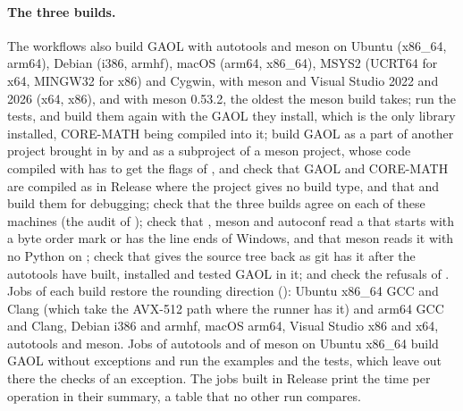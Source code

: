 \documentclass[12pt,a4paper,twoside,openright]{book}
\begin{document}
\paragraph{The three builds.} The workflows also build GAOL with autotools
and meson on Ubuntu (x86\_64, arm64), Debian (i386, armhf), macOS (arm64,
x86\_64), MSYS2 (UCRT64 for x64, MINGW32 for x86) and Cygwin, with meson and
Visual Studio 2022 and 2026 (x64, x86), and with meson 0.53.2, the oldest
the meson build takes; run the tests, and build them again with the GAOL
they install, which is the only library installed, CORE-MATH being compiled
into it; build GAOL as a part of another project brought in by
 and as a subproject of a meson project, whose code
compiled with  has to get the flags of , and
check that GAOL and CORE-MATH are compiled as in Release where the project
gives no build type, and that  and 
build them for debugging;\newinvfive{} check that the three builds agree on
each of these machines (the audit of ); check that
, meson and autoconf read a  that starts
with a byte order mark or has the line ends of Windows, and that meson reads
it with no Python on ; check that  gives the
source tree back as git has it after the autotools have built, installed
and tested GAOL in it; and check the refusals of .
Jobs of each build restore the rounding direction
(): Ubuntu x86\_64 GCC and Clang (which
take the AVX-512 path where the runner has it) and arm64 GCC and Clang,
Debian i386 and armhf, macOS arm64, Visual Studio x86 and x64, autotools and
meson. Jobs of autotools and of meson on Ubuntu x86\_64 build GAOL without
exceptions and run the examples and the tests, which leave out there the
checks of an exception. The jobs built in Release print the time per
operation in their summary, a table that no other run compares.
\end{document}
